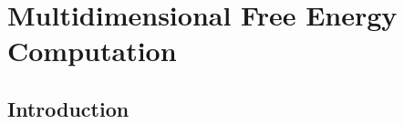 \chapter{Multidimensional Free Energy Computation}

\section{Introduction}

\begin{spacing}{2.0}
    \lipsum[1]
\end{spacing}
